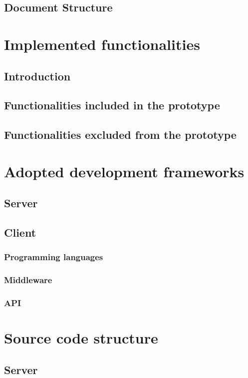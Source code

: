     \section{Document Structure}
    	
    
\newpage
\chapter{Implemented functionalities}
    \section{Introduction}
    \section{Functionalities included in the prototype}
    \section{Functionalities excluded from the prototype}
    
\newpage
\chapter{Adopted development frameworks}
    \section{Server}
    	
    \section{Client}
	    \subsection{Programming languages}
	    \subsection{Middleware}
	    \subsection{API}

\newpage
\chapter{Source code structure}
	\section{Server}

